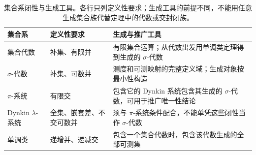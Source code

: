\begin{table}[htbp]
\centering\small\renewcommand{\arraystretch}{1.18}\setlength{\tabcolsep}{4pt}
\caption[集合系闭性与生成工具]{集合系闭性与生成工具。各行只列定义性要求；生成工具的前提不同，不能用任意生成集合族代替定理中的代数或交封闭族。}
\label{b1:tab:set-system-closures}
\begin{tabularx}{\linewidth}{@{}>{\raggedright\arraybackslash}p{3.1cm}>{\raggedright\arraybackslash}p{4.7cm}>{\raggedright\arraybackslash}X@{}}
\toprule
集合系 & 定义性要求 & 生成与推广工具 \\
\midrule
集合代数 & 补集、有限并 & 有限集合运算；从代数出发用单调类定理得到生成的 \(\sigma\)-代数 \\
\(\sigma\)-代数 & 补集、可数并 & 测度和可测映射的完整定义域；生成对象按最小性构造 \\
\(\pi\)-系统 & 有限交 & 包含它的 Dynkin 系统包含其生成的 \(\sigma\)-代数，可用于推广唯一性结论 \\
Dynkin \(\lambda\)-系统 & 全集、嵌套差、不交可数并 & 须与 \(\pi\)-系统条件配合，不能单凭这些闭性当作 \(\sigma\)-代数 \\
单调类 & 递增并、递减交 & 包含一个集合代数时，包含该代数生成的全部可测集 \\
\bottomrule
\end{tabularx}
\end{table}
